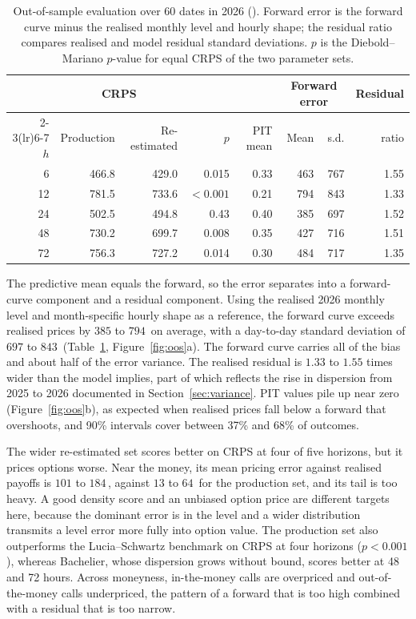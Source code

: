 \begin{table}[htbp]
\centering
\caption{Out-of-sample evaluation over 60 dates in 2026 (\TRY). Forward
error is the forward curve minus the realised monthly level and hourly shape;
the residual ratio compares realised and model residual standard deviations.
$p$ is the Diebold--Mariano $p$-value for equal CRPS of the two parameter
sets.}
\label{tab:oos}
\small
\setlength{\tabcolsep}{4.5pt}
\begin{tabular}{@{}rrrrrrrr@{}}
\toprule
& \multicolumn{2}{c}{CRPS} & & & \multicolumn{2}{c}{Forward error} & Residual \\
\cmidrule(lr){2-3}\cmidrule(lr){6-7}
$h$ & Production & Re-estimated & $p$ & PIT mean & Mean & s.d. & ratio \\
\midrule
6  & 466.8 & 429.0 & 0.015     & 0.33 & 463 & 767 & 1.55 \\
12 & 781.5 & 733.6 & $<0.001$  & 0.21 & 794 & 843 & 1.33 \\
24 & 502.5 & 494.8 & 0.43      & 0.40 & 385 & 697 & 1.52 \\
48 & 730.2 & 699.7 & 0.008     & 0.35 & 427 & 716 & 1.51 \\
72 & 756.3 & 727.2 & 0.014     & 0.30 & 484 & 717 & 1.35 \\
\bottomrule
\end{tabular}
\end{table}

The predictive mean equals the forward, so the error separates into a
forward-curve component and a residual component. Using the realised 2026
monthly level and month-specific hourly shape as a reference, the forward curve
exceeds realised prices by $385$ to $794$\,\TRY{} on average, with a
day-to-day standard deviation of $697$ to $843$\,\TRY{}
(Table~\ref{tab:oos}, Figure~\ref{fig:oos}a). The forward curve carries all of
the bias and about half of the error variance. The realised residual is $1.33$
to $1.55$ times wider than the model implies, part of which reflects the rise
in dispersion from 2025 to 2026 documented in Section~\ref{sec:variance}. PIT
values pile up near zero (Figure~\ref{fig:oos}b), as expected when realised
prices fall below a forward that overshoots, and 90\% intervals cover between
37\% and 68\% of outcomes.

The wider re-estimated set scores better on CRPS at four of five horizons, but
it prices options worse. Near the money, its mean pricing error against
realised payoffs is $101$ to $184$\,\TRY, against $13$ to $64$\,\TRY{} for the
production set, and its tail is too heavy. A good density score and an
unbiased option price are different targets here, because the dominant error
is in the level and a wider distribution transmits a level error more fully
into option value. The production set also outperforms the Lucia--Schwartz
benchmark on CRPS at four horizons ($p<0.001$), whereas Bachelier, whose
dispersion grows without bound, scores better at 48 and 72 hours. Across
moneyness, in-the-money calls are overpriced and out-of-the-money calls
underpriced, the pattern of a forward that is too high combined with a
residual that is too narrow.

